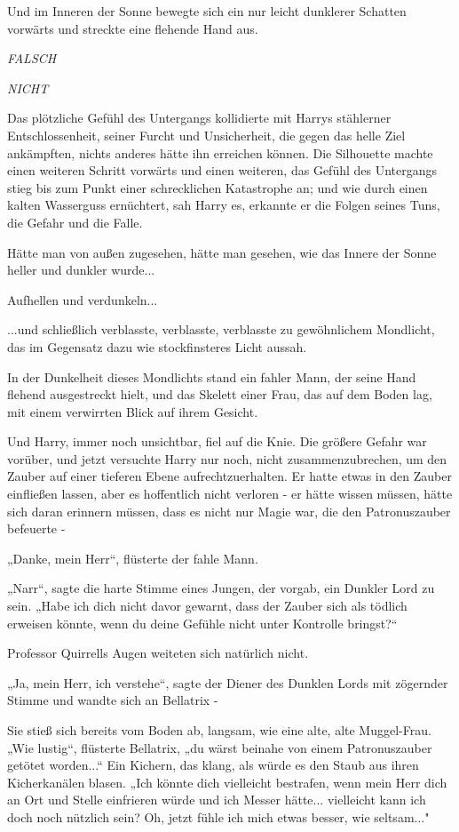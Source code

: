{Und im Inneren der Sonne bewegte sich ein nur leicht dunklerer Schatten vorwärts und streckte eine flehende Hand aus.

\emph{\emph{FALSCH}}

\emph{\emph{NICHT}}

Das plötzliche Gefühl des Untergangs kollidierte mit Harrys stählerner Entschlossenheit, seiner Furcht und Unsicherheit, die gegen das helle Ziel ankämpften, nichts anderes hätte ihn erreichen können. Die Silhouette machte einen weiteren Schritt vorwärts und einen weiteren, das Gefühl des Untergangs stieg bis zum Punkt einer schrecklichen Katastrophe an; und wie durch einen kalten Wasserguss ernüchtert, sah Harry es, erkannte er die Folgen seines Tuns, die Gefahr und die Falle.

Hätte man von außen zugesehen, hätte man gesehen, wie das Innere der Sonne heller und dunkler wurde...

Aufhellen und verdunkeln...

...und schließlich verblasste, verblasste, verblasste zu gewöhnlichem Mondlicht, das im Gegensatz dazu wie stockfinsteres Licht aussah.

In der Dunkelheit dieses Mondlichts stand ein fahler Mann, der seine Hand flehend ausgestreckt hielt, und das Skelett einer Frau, das auf dem Boden lag, mit einem verwirrten Blick auf ihrem Gesicht.

Und Harry, immer noch unsichtbar, fiel auf die Knie. Die größere Gefahr war vorüber, und jetzt versuchte Harry nur noch, nicht zusammenzubrechen, um den Zauber auf einer tieferen Ebene aufrechtzuerhalten. Er hatte etwas in den Zauber einfließen lassen, aber es hoffentlich nicht verloren - er hätte wissen müssen, hätte sich daran erinnern müssen, dass es nicht nur Magie war, die den Patronuszauber befeuerte -

„Danke, mein Herr“, flüsterte der fahle Mann.

„Narr“, sagte die harte Stimme eines Jungen, der vorgab, ein Dunkler Lord zu sein. „Habe ich dich nicht davor gewarnt, dass der Zauber sich als tödlich erweisen könnte, wenn du deine Gefühle nicht unter Kontrolle bringst?“

Professor Quirrells Augen weiteten sich natürlich nicht.

„Ja, mein Herr, ich verstehe“, sagte der Diener des Dunklen Lords mit zögernder Stimme und wandte sich an Bellatrix -

Sie stieß sich bereits vom Boden ab, langsam, wie eine alte, alte Muggel-Frau. „Wie lustig“, flüsterte Bellatrix, „du wärst beinahe von einem Patronuszauber getötet worden...“ Ein Kichern, das klang, als würde es den Staub aus ihren Kicherkanälen blasen. „Ich könnte dich vielleicht bestrafen, wenn mein Herr dich an Ort und Stelle einfrieren würde und ich Messer hätte... vielleicht kann ich doch noch nützlich sein? Oh, jetzt fühle ich mich etwas besser, wie seltsam..."

}
